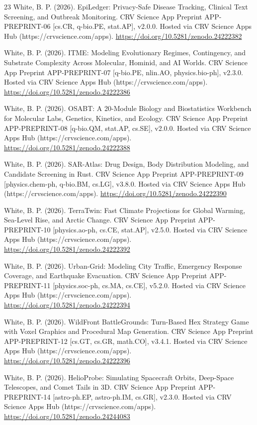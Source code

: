 \documentclass[10pt,letterpaper]{article}
\begin{document}
\begin{thebibliography}{23}
 White, B. P. (2026). EpiLedger: Privacy-Safe Disease Tracking, Clinical Text Screening, and Outbreak Monitoring. CRV Science App Preprint APP-PREPRINT-06 [cs.CR, q-bio.PE, stat.AP], v2.0.0. Hosted via CRV Science Apps Hub (https://crvscience.com/apps). \url{https://doi.org/10.5281/zenodo.24222382}

 White, B. P. (2026). ITME: Modeling Evolutionary Regimes, Contingency, and Substrate Complexity Across Molecular, Hominid, and AI Worlds. CRV Science App Preprint APP-PREPRINT-07 [q-bio.PE, nlin.AO, physics.bio-ph], v2.3.0. Hosted via CRV Science Apps Hub (https://crvscience.com/apps). \url{https://doi.org/10.5281/zenodo.24222386}

 White, B. P. (2026). OSABT: A 20-Module Biology and Biostatistics Workbench for Molecular Labs, Genetics, Kinetics, and Ecology. CRV Science App Preprint APP-PREPRINT-08 [q-bio.QM, stat.AP, cs.SE], v2.0.0. Hosted via CRV Science Apps Hub (https://crvscience.com/apps). \url{https://doi.org/10.5281/zenodo.24222388}

 White, B. P. (2026). SAR-Atlas: Drug Design, Body Distribution Modeling, and Candidate Screening in Rust. CRV Science App Preprint APP-PREPRINT-09 [physics.chem-ph, q-bio.BM, cs.LG], v3.8.0. Hosted via CRV Science Apps Hub (https://crvscience.com/apps). \url{https://doi.org/10.5281/zenodo.24222390}

 White, B. P. (2026). TerraTwin: Fast Climate Projections for Global Warming, Sea-Level Rise, and Arctic Change. CRV Science App Preprint APP-PREPRINT-10 [physics.ao-ph, cs.CE, stat.AP], v2.5.0. Hosted via CRV Science Apps Hub (https://crvscience.com/apps). \url{https://doi.org/10.5281/zenodo.24222392}

 White, B. P. (2026). Urban-Grid: Modeling City Traffic, Emergency Response Coverage, and Earthquake Evacuation. CRV Science App Preprint APP-PREPRINT-11 [physics.soc-ph, cs.MA, cs.CE], v5.2.0. Hosted via CRV Science Apps Hub (https://crvscience.com/apps). \url{https://doi.org/10.5281/zenodo.24222394}

 White, B. P. (2026). WildFront BattleGrounds: Turn-Based Hex Strategy Game with Voxel Graphics and Procedural Map Generation. CRV Science App Preprint APP-PREPRINT-12 [cs.GT, cs.GR, math.CO], v3.4.1. Hosted via CRV Science Apps Hub (https://crvscience.com/apps). \url{https://doi.org/10.5281/zenodo.24222396}

 White, B. P. (2026). HelioProbe: Simulating Spacecraft Orbits, Deep-Space Telescopes, and Comet Tails in 3D. CRV Science App Preprint APP-PREPRINT-14 [astro-ph.EP, astro-ph.IM, cs.GR], v2.3.0. Hosted via CRV Science Apps Hub (https://crvscience.com/apps). \url{https://doi.org/10.5281/zenodo.24244083}


\end{thebibliography}
\end{document}
